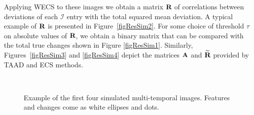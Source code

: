 \documentclass[journal]{IEEEtran}
\newcommand{\vA}{{\textbf A}}
\newcommand{\vR}{{\textbf R}}
\begin{document}
Applying WECS to these images we obtain a matrix $\vR$ of correlations between deviations of each $\mathcal{I}$ entry with the total squared mean deviation. A typical example of $\vR$ is presented in Figure~\ref{figResSim2}. For some choice of threshold $\tau$ on absolute values of $\vR$, we obtain a binary matrix that can be compared with the total true changes shown in Figure \ref{figResSim1}.
Similarly, Figures~\ref{figResSim3} and \ref{figResSim4} depict the matrices $\vA$ and $\widetilde{\vR}$ provided by TAAD and ECS methods.



\begin{figure}[hbt]
\centering

\mbox{
}
\mbox{
}

\caption{Example of the first four simulated multi-temporal images. Features and changes come as white ellipses and dots.}
\label{F:EllipsoidChanges}
\end{figure}
\end{document}

